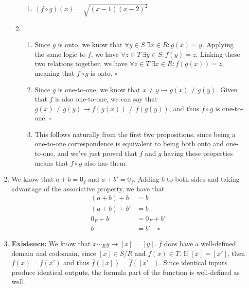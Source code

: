 \documentclass[12pt]{article}
\begin{document}
\begin{enumerate}
\begin{enumerate}
\begin{enumerate}
                        \item $(f \circ g)(x)=\sqrt{(x-1)(x-2)^2}$
                    \end{enumerate}
              \item \begin{enumerate}
                        \item Since $g$ is onto, we know that $\forall y \in S\ \exists x \in R: g(x)=y$.
                              Applying the same logic to $f$, we have $\forall z \in T\ \exists y \in S: f(y)=z$.
                              Linking these two relations together, we have $\forall z \in T\ \exists x \in R: f(g(x))=z$,
                              meaning that $f \circ g$ is onto. $\square$
                        \item Since $g$ is one-to-one, we know that $x \ne y \rightarrow g(x) \ne g(y)$.
                              Given that $f$ is also one-to-one, we can say that $g(x) \ne g(y) \rightarrow f(g(x)) \ne f(g(y))$,
                              and thus $f \circ g$ is one-to-one. $\square$
                        \item This follows naturally from the first two propositions, since being a one-to-one correspondence
                              is equivalent to being both onto and one-to-one, and we've just proved that $f$ and $g$ having these properties
                              means that $f \circ g$ also has them.
                    \end{enumerate}

          \end{enumerate}
    \item We know that $a+b=0_f$ and $a+b'=0_f$.
          Adding $b$ to both sides and taking advantage of the associative property, we have that
          \begin{align*}
              (a+b)
              +b       & =b                \\
              (a+b)+b' & =b                \\
              0_F+b    & =0_F+b'           \\
              b        & =b' \quad \square
          \end{align*}
    \item \textbf{Existence:} We know that $x \sim_R y \rightarrow [x]=[y]$.
          $\bar{f}$ does have a well-defined domain and codomain, since $[x]\in S/R$ and $f(x) \in T$.
          If $[x]=[x']$, then $f(x)=f(x')$ and thus $\hat{f}([x])=\hat{f}([x'])$.
          Since identical inputs produce identical outputs, the formula part of the function is well-defined as well.


\end{enumerate}
\end{document}
